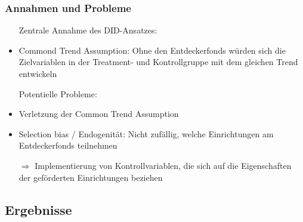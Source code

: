 \begin{frame}[fragile]
\frametitle{Annahmen und Probleme}
\begin{itemize}
\item[ ] Zentrale Annahme des DID-Ansatzes:
\item Commond Trend Assumption: Ohne den Entdeckerfonds würden sich die Zielvariablen in der Treatment- und Kontrollgruppe mit dem gleichen Trend entwickeln
\linebreak
\item[ ] Potentielle Probleme:
\item Verletzung der Common Trend Assumption
\item Selection bias / Endogenität: Nicht zufällig, welche Einrichtungen am Entdeckerfonds teilnehmen
\item [$\Rightarrow$] Implementierung von Kontrollvariablen, die sich auf die Eigenschaften der geförderten Einrichtungen beziehen
\end{itemize}
\end{frame}

\subsection{Ergebnisse}

